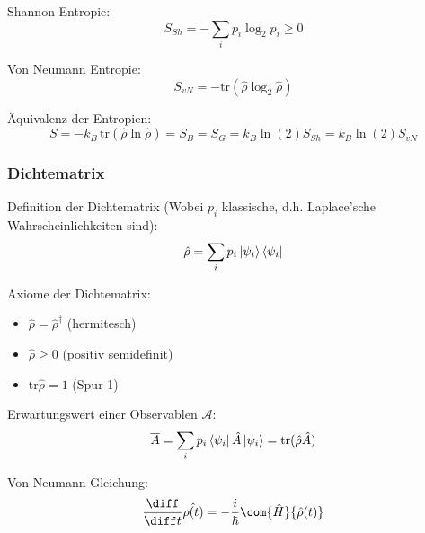 \documentclass[11pt]{article}
\numberwithin{equation}{section}
\begin{document}
        Shannon Entropie:
        \begin{equation}
          S_{Sh} = -\sum_i p_i\log_2{p_i} \ge 0
        \end{equation}

        Von Neumann Entropie:
        \begin{equation}
          S_{vN} = -\mathrm{tr}(\hat{\rho}\log_2\hat{\rho})
        \end{equation}

        Äquivalenz der Entropien:
        \begin{equation}
          S = -k_B\,\mathrm{tr}(\hat{\rho} \ln \hat{\rho}) = S_B = S_G = k_B\ln(2) S_{Sh} = k_B\ln(2) S_{vN}
        \end{equation}

      \subsubsection{Dichtematrix}
        Definition der Dichtematrix (Wobei $p_i$ klassische, d.h. Laplace'sche Wahrscheinlichkeiten sind):
        \begin{equation}
          \hat{\rho} = \sum_i p_i \Ket{\psi_i}\Bra{\psi_i}
        \end{equation}

        Axiome der Dichtematrix:
        \begin{itemize}\itemsep -0pt  %
          \item $\hat{\rho} = \hat{\rho}^\dagger$ \hfill{(hermitesch)}
          \item $\hat{\rho} \ge 0 $ \hfill{(positiv semidefinit)}
          \item $\mathrm{tr} \hat{\rho} = 1$ \hfill{(Spur 1)}
        \end{itemize}

        Erwartungswert einer Observablen $\mathcal{A}$:
        \begin{equation}
          \overline{A} = \sum_i p_i \Bra{\psi_i}\hat{A}\Ket{\psi_i} = \mathrm{tr} (\hat{\rho}\hat{A})
        \end{equation}

        Von-Neumann-Gleichung:
        \begin{equation}
          \tder{}{t}\hat{\rho(t)} = -\frac{i}{\hbar} \com{\hat{H}}{\hat{\rho}(t)}
        \end{equation}
\end{document}
